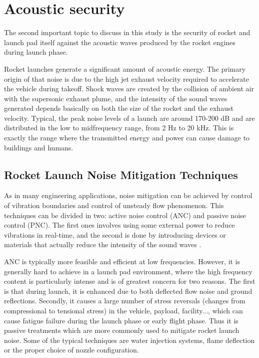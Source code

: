 \section{Acoustic security}

The second important topic to discuss in this study is the security of rocket and
launch pad itself against the acoustic waves produced by the rocket engines during
launch phase.

Rocket launches generate a significant amount of acoustic energy. The primary
origin of that noise is due to the high jet exhaust velocity required to accelerate
the vehicle during takeoff. Shock waves are created by the collision of ambient air
with the supersonic exhaust plume, and the intensity of the sound waves generated
depends basically on both the size of the rocket and the exhaust
velocity. Typical, the peak noise levels of a launch are around 170-200 dB and are
distributed in the low to midfrequency range, from 2 Hz to 20 kHz. This is
exactly the range where the transmitted energy and power can cause damage to
buildings and humans\cite{2016Teitel}.

\subsection{Rocket Launch Noise Mitigation Techniques}

As in many engineering applications, noise mitigation can be achieved by control
of vibration boundaries and control of unsteady flow phenomenon. This techniques
can be divided in two: active noise control (ANC) and passive noise control (PNC).
The first ones involves using some external power to reduce vibrations in real-time,
and the second is done by introducing devices or materials that actually reduce
the intensity of the sound waves \cite{2017Lubert}.

ANC is typically more feasible and efficient at low frequencies.
However, it is generally hard to achieve in a launch pad environment, where the high frequency
content is particularly intense and is of greatest concern for two reasons. The first is that during
launch, it is enhanced due to both deflected flow noise and ground reflections. Secondly, it
causes a large number of stress reversals (changes from compressional to tensional stress)
in the vehicle, payload, facility..., which can cause fatigue failure during the launch phase
or early flight phase. Thus it is passive
treatments which are more commonly used to mitigate rocket launch noise. Some of the
typical techniques are water injection systems, flame deflection or the proper choice of nozzle configuration.

